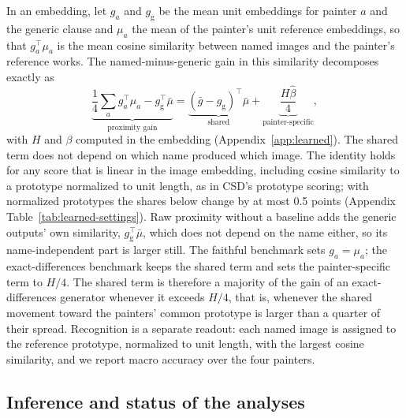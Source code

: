 \documentclass[10pt]{article}
\begin{document}
In an embedding, let $g_a$ and $g_{\mathrm{g}}$ be the mean unit embeddings for painter $a$ and the
generic clause and $\mu_a$ the mean of the painter's unit reference embeddings, so that
$g_a^\top\mu_a$ is the mean cosine similarity between named images and the painter's reference
works. The named-minus-generic gain in this similarity decomposes exactly as
\begin{equation}
\underbrace{\frac14\sum_a g_a^\top\mu_a-g_{\mathrm{g}}^\top\bar\mu}_{\text{proximity gain}}
=\underbrace{(\bar g-g_{\mathrm{g}})^\top\bar\mu}_{\text{shared}}
+\underbrace{\frac{H\widehat\beta}{4}}_{\text{painter-specific}},
\label{eq:prototype-gain}
\end{equation}
with $H$ and $\beta$ computed in the embedding (Appendix~\ref{app:learned}). The shared term does
not depend on which name produced which image. The identity holds for any score that is linear in
the image embedding, including cosine similarity to a prototype normalized to unit length, as in
CSD's prototype scoring; with normalized prototypes the shares below change by at most 0.5 points
(Appendix Table~\ref{tab:learned-settings}). Raw proximity without a baseline adds the generic
outputs' own similarity, $g_{\mathrm{g}}^\top\bar\mu$, which does not depend on the name either, so
its name-independent part is larger still. The faithful benchmark sets $g_a=\mu_a$; the
exact-differences benchmark keeps the shared term and sets the painter-specific term to $H/4$. The
shared term is therefore a majority of the gain of an exact-differences generator whenever it
exceeds $H/4$, that is, whenever the shared movement toward the painters' common prototype is
larger than a quarter of their spread. Recognition is a separate readout: each named image is
assigned to the reference prototype, normalized to unit length, with the largest cosine
similarity, and we report macro accuracy over the four painters.

\subsection{Inference and status of the analyses}\label{sec:inference}
\end{document}
